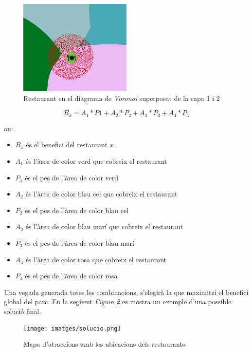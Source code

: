 \documentclass[12pt]{article}
\begin{document}
\begin{figure}[H]
	\centering
	\includegraphics[width=0.5\textwidth]{imatges/benefici_restaurant.png}
	\caption{Restaurant en el diagrama de \textit{Voronoi} superposat de la capa 1 i 2}
	\label{fig:benefici_restaurant}
\end{figure}

$$B_{x} = A_{1}*P{1} + A_{2}*P_{2} + A_{3}*P_{3} + A_{4}*P_{4}$$

on:

\begin{itemize}
	\item $B_{x}$ és el benefici del restaurant $x$
	\item $A_{1}$ és l'àrea de color verd que cobreix el restaurant
	\item $P_{1}$ és el pes de l'àrea de color verd 
	\item $A_{2}$ és l'àrea de color blau cel que cobreix el restaurant
	\item $P_{2}$ és el pes de l'àrea de color blau cel 
	\item $A_{3}$ és l'àrea de color blau marí que cobreix el restaurant
	\item $P_{3}$ és el pes de l'àrea de color blau marí 
	\item $A_{4}$ és l'àrea de color rosa que cobreix el restaurant
	\item $P_{4}$ és el pes de l'àrea de color rosa 
\end{itemize}

Una vegada generada totes les combinacions, s'elegirà la que maximitzi el benefici global del parc. En la següent \textit{Figura \ref{fig:mapa_restaurants}} es mostra un exemple d'una possible solució final.

\begin{figure}[H]
	\centering
	\texttt{[image: imatges/solucio.png]}
	\caption{Mapa d'atraccions amb les ubicacions dels restaurants}
	\label{fig:mapa_restaurants}
\end{figure}
\end{document}
